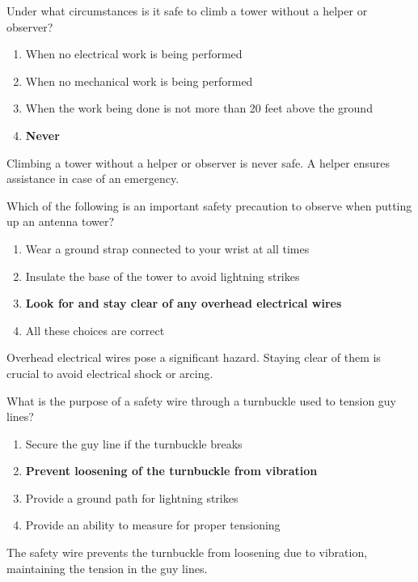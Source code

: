 
\begin{tcolorbox}[colback=gray!10!white,colframe=black!75!black,title={T0B03}]
Under what circumstances is it safe to climb a tower without a helper or observer?
\begin{enumerate}[label=\Alph*,noitemsep]
    \item When no electrical work is being performed
    \item When no mechanical work is being performed
    \item When the work being done is not more than 20 feet above the ground
    \item \textbf{Never}
\end{enumerate}
\end{tcolorbox}
Climbing a tower without a helper or observer is never safe. A helper ensures assistance in case of an emergency.


\begin{tcolorbox}[colback=gray!10!white,colframe=black!75!black,title={T0B04}]
Which of the following is an important safety precaution to observe when putting up an antenna tower?
\begin{enumerate}[label=\Alph*,noitemsep]
    \item Wear a ground strap connected to your wrist at all times
    \item Insulate the base of the tower to avoid lightning strikes
    \item \textbf{Look for and stay clear of any overhead electrical wires}
    \item All these choices are correct
\end{enumerate}
\end{tcolorbox}
Overhead electrical wires pose a significant hazard. Staying clear of them is crucial to avoid electrical shock or arcing.


\begin{tcolorbox}[colback=gray!10!white,colframe=black!75!black,title={T0B05}]
What is the purpose of a safety wire through a turnbuckle used to tension guy lines?
\begin{enumerate}[label=\Alph*,noitemsep]
    \item Secure the guy line if the turnbuckle breaks
    \item \textbf{Prevent loosening of the turnbuckle from vibration}
    \item Provide a ground path for lightning strikes
    \item Provide an ability to measure for proper tensioning
\end{enumerate}
\end{tcolorbox}
The safety wire prevents the turnbuckle from loosening due to vibration, maintaining the tension in the guy lines.

